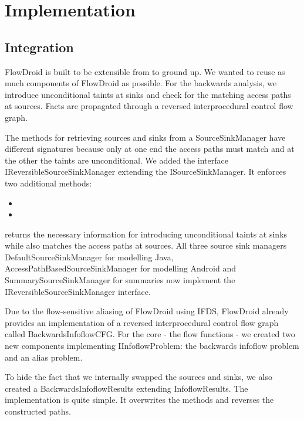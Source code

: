 \documentclass[../draft.tex]{subfiles}
\begin{document}
    \chapter{Implementation}

    \section{Integration}
    FlowDroid is built to be extensible from to ground up. We wanted to reuse as much components of FlowDroid as possible. For the backwards analysis, we introduce unconditional taints at sinks and check for the matching access paths at sources. Facts are propagated through a reversed interprocedural control flow graph.

    The methods for retrieving sources and sinks from a SourceSinkManager have different signatures because only at one end the access paths must match and at the other the taints are unconditional. 
    We added the interface IReversibleSourceSinkManager extending the ISourceSinkManager. It enforces two additional methods:
    \begin{itemize}
        \item {}
        \item {}
    \end{itemize}
     returns the necessary information for introducing unconditional taints at sinks while  also matches the access paths at sources.
    All three source sink managers DefaultSourceSinkManager for modelling Java, AccessPathBasedSourceSinkManager for modelling Android and SummarySourceSinkManager for summaries now implement the IReversibleSourceSinkManager interface.

    Due to the flow-sensitive aliasing of FlowDroid using IFDS, FlowDroid already provides an implementation of a reversed interprocedural control flow graph called BackwardsInfoflowCFG.
    For the core - the flow functions - we created two new components implementing IInfoflowProblem: the backwards infoflow problem and an alias problem. 

    To hide the fact that we internally swapped the sources and sinks, we also created a BackwardsInfoflowResults extending InfoflowResults. The implementation is quite simple. It overwrites the  methods and reverses the constructed paths.
\end{document}
